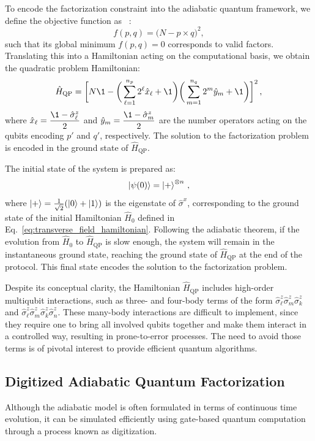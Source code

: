 To encode the factorization constraint into the adiabatic quantum framework, we define the objective function as ~\cite{peng_quantum_2008}:
\begin{equation}
	f(p,q) = \big(N - p \times q \big)^2,
\end{equation}
such that its global minimum $f(p,q)=0$ corresponds to valid factors. Translating this into a Hamiltonian acting on the computational basis, we obtain the quadratic problem Hamiltonian:
\begin{equation}
	\hat{H}_\mathrm{QP} = \bigg[ N \1 - \bigg( \sum_{\ell=1}^{n_p} 2^\ell \hat{x}_\ell + \1 \bigg)
	\bigg( \sum_{m=1}^{n_q} 2^m \hat{y}_m + \1 \bigg) \bigg]^2\,,
	\label{eq:quadratic_problem_hamiltonian}
\end{equation}
where $\hat{x}_\ell = \dfrac{\1 - \hat{\sigma}_\ell^z}{2}$ and $\hat{y}_m = \dfrac{\1 - \hat{\sigma}_m^z}{2}$ are the number operators acting on the qubits encoding $p'$ and $q'$, respectively. The solution to the factorization problem is encoded in the ground state of $\hat{H}_\mathrm{QP}$.

The initial state of the system is prepared as:
\begin{equation}
	\ket{\psi(0)} = \ket{+}^{\otimes n}\,,
	\label{eq:initial_state}
\end{equation}
where $\ket{+} = \frac{1}{\sqrt{2}} (\ket{0} + \ket{1})$ is the eigenstate of $\hat{\sigma}^x$, corresponding to the ground state of the initial Hamiltonian $\hat{H}_0$ defined in Eq.~\ref{eq:transverse_field_hamiltonian}.
Following the adiabatic theorem, if the evolution from $\hat{H}_0$ to $\hat{H}_\mathrm{QP}$ is slow enough, the system will remain in the instantaneous ground state, reaching the ground state of $\hat{H}_\mathrm{QP}$ at the end of the protocol. This final state encodes the solution to the factorization problem.

Despite its conceptual clarity, the Hamiltonian $\hat{H}_\mathrm{QP}$ includes high-order multiqubit interactions, such as three- and four-body terms of the form $\hat{\sigma}_\ell^z \hat{\sigma}_m^z \hat{\sigma}_k^z$ and $\hat{\sigma}_\ell^z \hat{\sigma}_m^z \hat{\sigma}_k^z \hat{\sigma}_n^z$. These many-body interactions are difficult to implement, since they require one to bring all involved qubits together and make them interact in a controlled way, resulting in prone-to-error processes. The need to avoid those terms is of pivotal interest to provide efficient quantum algorithms.

\subsection{Digitized Adiabatic Quantum Factorization}
Although the adiabatic model is often formulated in terms of continuous time evolution, it can be simulated efficiently using gate-based quantum computation through a process known as digitization.

